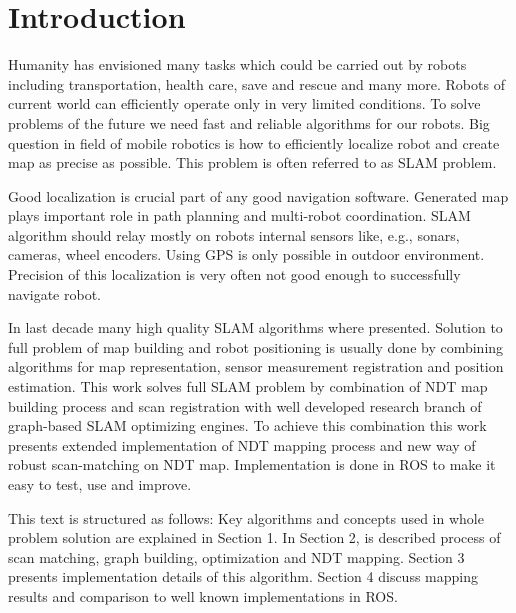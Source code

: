 \chapter*{Introduction}
Humanity has envisioned many tasks which could be carried out by robots including transportation, health care, save and rescue and many more. Robots of current world can efficiently operate only in very limited conditions. To solve problems of the future we need fast and reliable algorithms for our robots. Big question in field of mobile robotics is how to efficiently localize robot and create map as precise as possible. This problem is often referred to as \gls{SLAM} problem.

Good localization is crucial part of any good navigation software. Generated map plays important role in path planning and  multi-robot coordination. SLAM algorithm should relay mostly on robots internal sensors like, e.g., sonars, cameras, wheel encoders. Using \gls{GPS} is only possible in outdoor environment. Precision of this localization is very often not good enough to successfully navigate robot.

In last decade many high quality \gls{SLAM} algorithms where presented. Solution to full problem of map building and robot positioning is usually done by combining algorithms for map representation, sensor measurement registration and position estimation. This work solves full \gls{SLAM} problem by combination of \gls{NDT} map building process and scan registration with well developed research branch of graph-based \gls{SLAM} optimizing engines. To achieve this combination this work presents extended implementation of \gls{NDT} mapping process and new way of robust scan-matching on \gls{NDT} map. Implementation is done in \gls{ROS} to make it easy to test, use and improve.

This text is structured as follows: Key algorithms and concepts used in whole problem solution are explained in Section 1. In Section 2, is described process of scan matching, graph building, optimization and NDT mapping. Section 3 presents implementation details of this algorithm. Section 4 discuss mapping results and comparison to well known implementations in ROS.  

